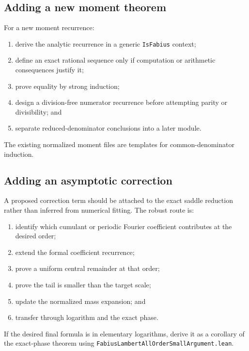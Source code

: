 \documentclass[11pt,oneside]{article}
\theoremstyle{definition}
\theoremstyle{remark}
\begin{document}
\subsection{Adding a new moment theorem}
For a new moment recurrence:
\begin{enumerate}
  \item derive the analytic recurrence in a generic \nolinkurl{IsFabius} context;
  \item define an exact rational sequence only if computation or arithmetic consequences justify it;
  \item prove equality by strong induction;
  \item design a division-free numerator recurrence before attempting parity or divisibility; and
  \item separate reduced-denominator conclusions into a later module.
\end{enumerate}
The existing normalized moment files are templates for common-denominator induction.

\subsection{Adding an asymptotic correction}
A proposed correction term should be attached to the exact saddle reduction rather than inferred from numerical fitting.  The robust route is:
\begin{enumerate}
  \item identify which cumulant or periodic Fourier coefficient contributes at the desired order;
  \item extend the formal coefficient recurrence;
  \item prove a uniform central remainder at that order;
  \item prove the tail is smaller than the target scale;
  \item update the normalized mass expansion; and
  \item transfer through logarithm and the exact phase.
\end{enumerate}
If the desired final formula is in elementary logarithms, derive it as a corollary of the exact-phase theorem using \nolinkurl{FabiusLambertAllOrderSmallArgument.lean}.
\end{document}
